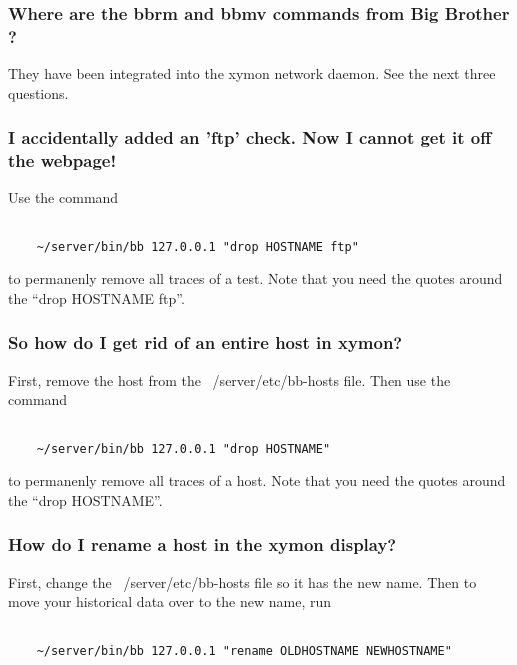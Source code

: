 \subsubsection{Where are the bbrm and bbmv commands from Big Brother ?}


 They have been integrated into the xymon network daemon. See the next three questions.
 
\subsubsection{I accidentally added an 'ftp' check. Now I cannot get it off the webpage!}


 Use the command
\begin{verbatim}

    ~/server/bin/bb 127.0.0.1 "drop HOSTNAME ftp"

\end{verbatim}


 to permanenly remove all traces of a test. Note that you need the quotes around the ``drop HOSTNAME ftp''.
 
\subsubsection{So how do I get rid of an entire host in xymon?}


 First, remove the host from the ~/server/etc/bb-hosts file. Then use the command
\begin{verbatim}

    ~/server/bin/bb 127.0.0.1 "drop HOSTNAME"

\end{verbatim}


 to permanenly remove all traces of a host. Note that you need the quotes around the ``drop HOSTNAME''.
 
\subsubsection{How do I rename a host in the xymon display?}


 First, change the ~/server/etc/bb-hosts file so it has the new name. Then to move your historical data over to the new name, run
\begin{verbatim}

    ~/server/bin/bb 127.0.0.1 "rename OLDHOSTNAME NEWHOSTNAME"

\end{verbatim}
 
